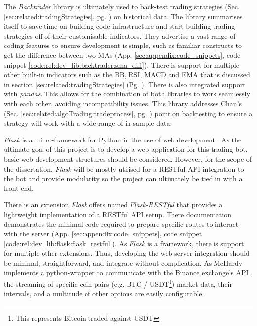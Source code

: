 The \textit{Backtrader} \cite{MISC:BACKTRADER} library is ultimately used to back-test trading strategies (Sec. \ref{sec:related:tradingStrategies}, pg. \pageref{sec:related:tradingStrategies}) on historical data. The library summarises itself to save time on building code infrastructure and start building trading strategies off of their customisable indicators. They advertise a vast range of coding features to ensure development is simple, such as familiar constructs to get the difference between two MAs (App. \ref{sec:appendix:code_snippets}, code snippet \ref{code:rel:dev_lib:backtrader:sma_diff}). There is support for multiple other built-in indicators such as the BB, RSI, MACD and EMA that is discussed in section \ref{sec:related:tradingStrategies} (Pg. \pageref{sec:related:tradingStrategies}). There is also integrated support with \textit{pandas}. This allows for the combination of both libraries to work seamlessly with each other, avoiding incompatibility issues. This library addresses Chan's \cite{BOOK:Chan:2013} (Sec. \ref{sec:related:algoTrading:tradeprocess}, pg. \pageref{sec:related:algoTrading:tradeprocess}) point on backtesting to ensure a strategy will work with a wide range of in-sample data.

\textit{Flask} is a micro-framework for Python in the use of web development \cite{MISC:FLASK}. As the ultimate goal of this project is to develop a web application for this trading bot, basic web development structures should be considered. However, for the scope of the dissertation, \textit{Flask} will be mostly utilised for a RESTful API integration to the bot and provide modularity so the project can ultimately be tied in with a front-end. 

There is an extension \textit{Flask} offers named \textit{Flask-RESTful} that provides a lightweight implementation of a RESTful API setup. There documentation demonstrates the minimal code required to prepare specific routes to interact with the server (App. \ref{sec:appendix:code_snippets}, code snippet \ref{code:rel:dev_lib:flask:flask_restful}). As \textit{Flask} is a framework, there is support for multiple other extensions. Thus, developing the web server integration should be minimal, straightforward, and integrate without complication. As McHardy \cite{MISC:Python-Binance} implements a python-wrapper to communicate with the Binance exchange's API \cite{WEB:BINANCE_API:2018}, the streaming of specific coin pairs (e.g. BTC / USDT\footnote{This represents Bitcoin traded against USDT}) market data, their intervals, and a multitude of other options are easily configurable.  


